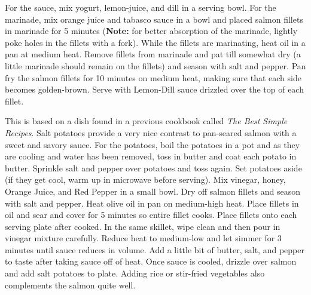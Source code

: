 \documentclass[oneside]{recipe}
\begin{document}
For the sauce, mix yogurt, lemon-juice, and dill in a serving bowl. For the marinade, mix orange juice and tabasco sauce in a bowl and placed salmon fillets in marinade for 5 minutes (\textbf{Note:} for better absorption of the marinade, lightly poke holes in the fillets with a fork). While the fillets are marinating, heat oil in a pan at medium heat. Remove fillets from marinade and pat till somewhat dry (a little marinade should remain on the fillets) and season with salt and pepper. Pan fry the salmon fillets for 10 minutes on medium heat, making sure that each side becomes golden-brown. Serve with Lemon-Dill sauce drizzled over the top of each fillet. 


This is based on a dish found in a previous cookbook called \textit{The Best Simple Recipes}. Salt potatoes provide a very nice contrast to pan-seared salmon with a sweet and savory sauce. For the potatoes, boil the potatoes in a pot and as they are cooling and water has been removed, toss in butter and coat each potato in butter. Sprinkle salt and pepper over potatoes and toss again. Set potatoes aside (if they get cool, warm up in microwave before serving). Mix vinegar, honey, Orange Juice, and Red Pepper in a small bowl. Dry off salmon fillets and season with salt and pepper. Heat olive oil in pan on medium-high heat. Place fillets in oil and sear and cover for 5 minutes so entire fillet cooks. Place fillets onto each serving plate after cooked. In the same skillet, wipe clean and then pour in vinegar mixture carefully. Reduce heat to medium-low and let simmer for 3 minutes until sauce reduces in volume. Add a little bit of butter, salt, and pepper to taste after taking sauce off of heat. Once sauce is cooled, drizzle over salmon and add salt potatoes to plate. Adding rice or stir-fried vegetables also complements the salmon quite well. 


\end{document}
